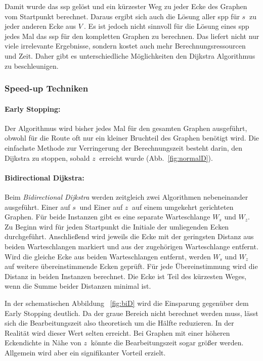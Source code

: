 Damit wurde das \gls{ssp} gelöst und ein kürzester Weg zu jeder Ecke des Graphen vom Startpunkt berechnet.
Daraus ergibt sich auch die Lösung aller \gls{spp} für $s~$ zu jeder anderen Ecke aus $V~$.
Es ist jedoch nicht sinnvoll für die Lösung eines \gls{spp} jedes Mal das \gls{ssp} für den kompletten Graphen zu berechnen.
Das liefert nicht nur viele irrelevante Ergebnisse, sondern kostet auch mehr Berechnungsressourcen und Zeit.
Daher gibt es unterschiedliche Möglichkeiten den Dijkstra Algorithmus zu beschleunigen.

\subsubsection{Speed-up Techniken}

\paragraph*{Early Stopping:}
Der Algorithmus wird bisher jedes Mal für den gesamten Graphen ausgeführt, obwohl für die Route oft nur ein kleiner Bruchteil des Graphen benötigt wird.
Die einfachste Methode zur Verringerung der Berechnungszeit besteht darin, den Dijkstra zu stoppen, sobald $z~$ erreicht wurde (Abb.~\ref{fig:normalD}).

\paragraph*{Bidirectional Dijkstra:}
Beim \textit{Bidirectional Dijkstra} werden zeitgleich zwei Algorithmen nebeneinander ausgeführt.
Einer auf $s~$ und Einer auf $z~$ auf einem umgekehrt gerichteten Graphen.
Für beide Instanzen gibt es eine separate Warteschlange $W_{s}$ und $W_{z}$.
Zu Beginn wird für jeden Startpunkt die Initiale der umliegenden Ecken durchgeführt.
Anschließend wird jeweils die Ecke mit der geringsten Distanz aus beiden Warteschlangen markiert und aus der zugehörigen Warteschlange entfernt.
Wird die gleiche Ecke aus beiden Warteschlangen entfernt, werden $W_{s}$ und $W_{z}$ auf weitere übereinstimmende Ecken geprüft.
Für jede Übereinstimmung wird die Distanz in beiden Instanzen berechnet.
Die Ecke ist Teil des kürzesten Weges, wenn die Summe beider Distanzen minimal ist.\par
In der schematischen Abbildung ~\ref{fig:biD} wird die Einsparung gegenüber dem Early Stopping deutlich.
Da der graue Bereich nicht berechnet werden muss, lässt sich die Bearbeitungszeit also theoretisch um die Hälfte reduzieren.
In der Realität wird dieser Wert selten erreicht.
Bei Graphen mit einer höheren Eckendichte in Nähe von $z~$ könnte die Bearbeitungszeit sogar größer werden.
Allgemein wird aber ein signifikanter Vorteil erzielt.

